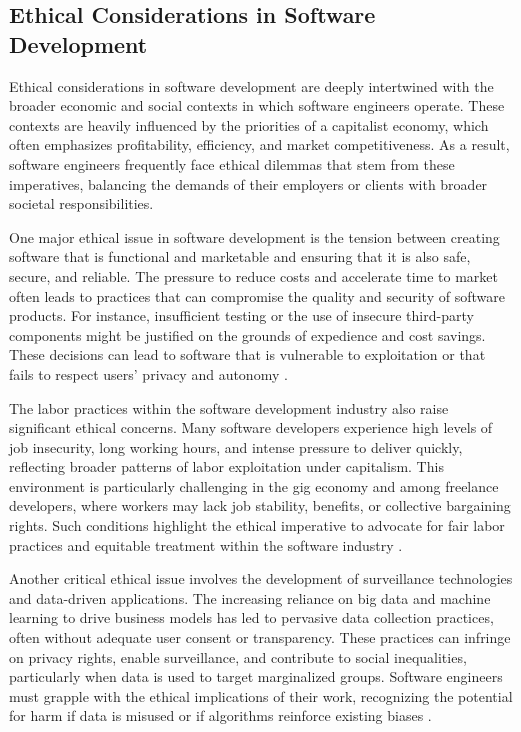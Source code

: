 \begin{refsection}
\subsection{Ethical Considerations in Software Development}

Ethical considerations in software development are deeply intertwined with the broader economic and social contexts in which software engineers operate. These contexts are heavily influenced by the priorities of a capitalist economy, which often emphasizes profitability, efficiency, and market competitiveness. As a result, software engineers frequently face ethical dilemmas that stem from these imperatives, balancing the demands of their employers or clients with broader societal responsibilities.

One major ethical issue in software development is the tension between creating software that is functional and marketable and ensuring that it is also safe, secure, and reliable. The pressure to reduce costs and accelerate time to market often leads to practices that can compromise the quality and security of software products. For instance, insufficient testing or the use of insecure third-party components might be justified on the grounds of expedience and cost savings. These decisions can lead to software that is vulnerable to exploitation or that fails to respect users' privacy and autonomy \cite[pp.~45-47]{stallman2002free}.

The labor practices within the software development industry also raise significant ethical concerns. Many software developers experience high levels of job insecurity, long working hours, and intense pressure to deliver quickly, reflecting broader patterns of labor exploitation under capitalism. This environment is particularly challenging in the gig economy and among freelance developers, where workers may lack job stability, benefits, or collective bargaining rights. Such conditions highlight the ethical imperative to advocate for fair labor practices and equitable treatment within the software industry \cite[pp.~150-152]{dean2016crowd}.

Another critical ethical issue involves the development of surveillance technologies and data-driven applications. The increasing reliance on big data and machine learning to drive business models has led to pervasive data collection practices, often without adequate user consent or transparency. These practices can infringe on privacy rights, enable surveillance, and contribute to social inequalities, particularly when data is used to target marginalized groups. Software engineers must grapple with the ethical implications of their work, recognizing the potential for harm if data is misused or if algorithms reinforce existing biases \cite[pp.~125-128]{eubanks2018automating}.


\end{refsection}
